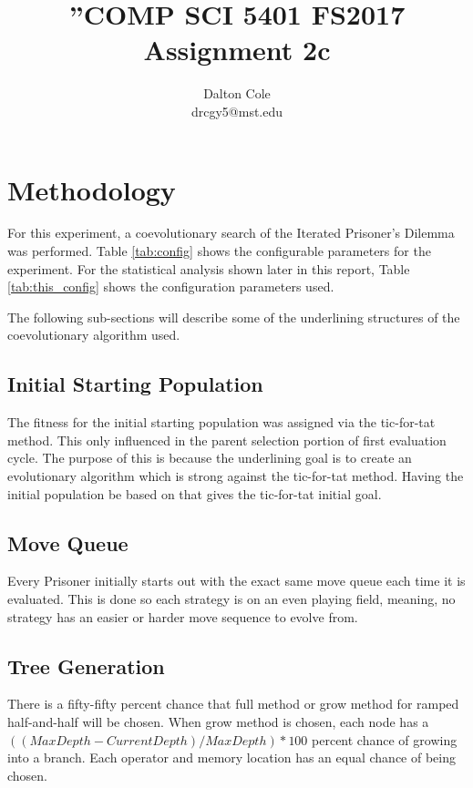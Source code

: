 \documentclass[times]{article}
\begin{document}
	\title{”COMP SCI 5401 FS2017 Assignment 2c}
	\author{Dalton Cole \\ drcgy5@mst.edu}
	\date{}
	\maketitle

	\section{Methodology}
	For this experiment, a coevolutionary search of the Iterated Prisoner’s Dilemma was performed. Table \ref{tab:config} shows the configurable parameters for the experiment. For the statistical analysis shown later in this report, Table \ref{tab:this_config} shows the configuration parameters used. 

	The following sub-sections will describe some of the underlining structures of the coevolutionary algorithm used.

	\subsection{Initial Starting Population}
	The fitness for the initial starting population was assigned via the tic-for-tat method. This only influenced in the parent selection portion of first evaluation cycle. The purpose of this is because the underlining goal is to create an evolutionary algorithm which is strong against the tic-for-tat method. Having the initial population be based on that gives the tic-for-tat initial goal.

	\subsection{Move Queue}
	Every Prisoner initially starts out with the exact same move queue each time it is evaluated. This is done so each strategy is on an even playing field, meaning, no strategy has an easier or harder move sequence to evolve from.

	\subsection{Tree Generation}
	There is a fifty-fifty percent chance that full method or grow method for ramped half-and-half will be chosen. When grow method is chosen, each node has a $((Max Depth - Current Depth) / Max Depth) * 100$ percent chance of growing into a branch. Each operator and memory location has an equal chance of being chosen. 
\end{document}
